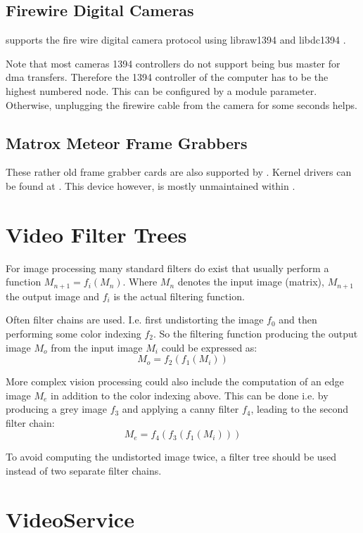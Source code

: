 \subsection{Firewire Digital Cameras}

\miro supports the fire wire digital camera protocol using
libraw1394\cite{} and libdc1394 \cite{}.
  
Note that most cameras 1394 controllers do not support being bus
master for dma transfers. Therefore the 1394 controller of the
computer has to be the highest numbered node. This can be configured
by a module parameter. Otherwise, unplugging the firewire cable from
the camera for some seconds helps.

\subsection{Matrox Meteor Frame Grabbers}

These rather old frame grabber cards are also supported by \miro.
Kernel drivers can be found at \cite{}. This device however, is mostly
unmaintained within \miro.

\section{Video Filter Trees}

For image processing many standard filters do exist that usually
perform a function $M_{n+1} = f_i(M_{n})$. Where $M_n$ denotes the input
image (matrix), $M_{n+1}$ the output image and $f_i$ is the actual
filtering function. 

Often filter chains are used. I.e. first undistorting
the image $f_0$ and then performing some color indexing $f_2$. So the
filtering function producing the output image $M_o$ from the input
image $M_i$ could be expressed as:  $$M_o = f_2(f_1(M_i))$$

More complex vision processing could also include the computation of
an edge image $M_e$ in addition to the color indexing above. This can
be done i.e. by producing a grey image $f_3$ and applying a canny
filter $f_4$, leading to the second filter chain: 
$$M_e = f_4(f_3(f_1(M_i)))$$

To avoid computing the undistorted image twice, a filter tree should
be used instead of two separate filter chains.


\section{VideoService}

